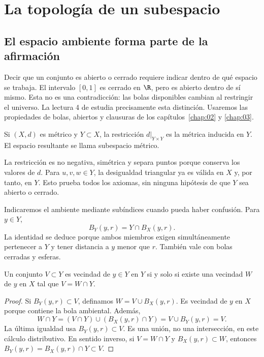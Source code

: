 \chapter{La topología de un subespacio}\label{chap:04}
\section{El espacio ambiente forma parte de la afirmación}
Decir que un conjunto es abierto o cerrado requiere indicar dentro de qué espacio se trabaja. El intervalo $[0,1]$ es cerrado en $\R$, pero es abierto dentro de sí mismo. Esta no es una contradicción: las bolas disponibles cambian al restringir el universo. La lectura 4 de \cite{valencia} estudia precisamente esta distinción. Usaremos las propiedades de bolas, abiertos y clausuras de los capítulos~\ref{chap:02} y \ref{chap:03}.

\begin{definicion}\label{ch04:subespacio}
Si $(X,d)$ es métrico y $Y\subset X$, la restricción $d|_{Y\times Y}$ es la métrica inducida en $Y$. El espacio resultante se llama subespacio métrico.
\end{definicion}
La restricción es no negativa, simétrica y separa puntos porque conserva los valores de $d$. Para $u,v,w\in Y$, la desigualdad triangular ya es válida en $X$ y, por tanto, en $Y$. Esto prueba todos los axiomas, sin ninguna hipótesis de que $Y$ sea abierto o cerrado.

Indicaremos el ambiente mediante subíndices cuando pueda haber confusión. Para $y\in Y$,
\begin{equation}\label{ch04:bolas}
B_Y(y,r)=Y\cap B_X(y,r).
\end{equation}
La identidad se deduce porque ambos miembros exigen simultáneamente pertenecer a $Y$ y tener distancia a $y$ menor que $r$. También vale con bolas cerradas y esferas.

\begin{proposicion}\label{ch04:vecindades}
Un conjunto $V\subset Y$ es vecindad de $y\in Y$ en $Y$ si y solo si existe una vecindad $W$ de $y$ en $X$ tal que $V=W\cap Y$.
\end{proposicion}
\begin{proof}
Si $B_Y(y,r)\subset V$, definamos $W=V\cup B_X(y,r)$. Es vecindad de $y$ en $X$ porque contiene la bola ambiental. Además,
\[
W\cap Y=(V\cap Y)\cup(B_X(y,r)\cap Y)
=V\cup B_Y(y,r)=V.
\]
La última igualdad usa $B_Y(y,r)\subset V$. Es una unión, no una intersección, en este cálculo distributivo. En sentido inverso, si $V=W\cap Y$ y $B_X(y,r)\subset W$, entonces $B_Y(y,r)=B_X(y,r)\cap Y\subset V$.
\end{proof}

